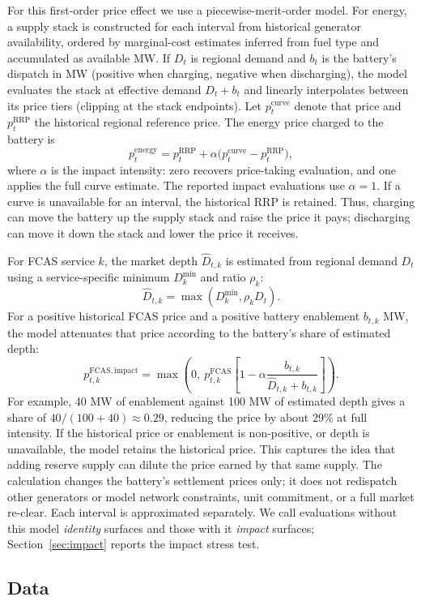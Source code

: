 \documentclass{article}
\begin{document}
For this first-order price effect we use a piecewise-merit-order model. For
energy, a supply stack is
constructed for each interval from historical generator availability, ordered
by marginal-cost estimates inferred from fuel type and accumulated as available
MW. If $D_t$ is regional demand and $b_t$ is the battery's dispatch in MW
(positive when charging, negative when discharging), the model evaluates the
stack at effective demand $D_t+b_t$ and linearly interpolates between its price
tiers (clipping at the stack endpoints). Let $p_t^{\mathrm{curve}}$ denote that
price and $p_t^{\mathrm{RRP}}$ the historical regional reference price. The
energy price charged to the battery is
\[
  p_t^{\mathrm{energy}}
  = p_t^{\mathrm{RRP}}
    + \alpha\bigl(p_t^{\mathrm{curve}}-p_t^{\mathrm{RRP}}\bigr),
\]
where $\alpha$ is the impact intensity: zero recovers price-taking evaluation,
and one applies the full curve estimate. The reported impact evaluations use
$\alpha=1$. If a curve is unavailable for an
interval, the historical RRP is retained. Thus, charging can move the battery up
the supply stack and raise the price it pays; discharging can move it down the
stack and lower the price it receives.

For FCAS service $k$, the market depth $\widehat D_{t,k}$ is estimated from
regional demand $D_t$ using a service-specific minimum $D_k^{\min}$ and ratio
$\rho_k$:
\[
  \widehat D_{t,k}=\max(D_k^{\min},\rho_k D_t).
\]
For a positive historical FCAS price and a positive battery enablement
$b_{t,k}$ MW, the model attenuates that price according to the battery's share
of estimated depth:
\[
  p_{t,k}^{\mathrm{FCAS,impact}}
  = \max\!\left(0,\ p_{t,k}^{\mathrm{FCAS}}
    \left[1-\alpha\frac{b_{t,k}}{\widehat D_{t,k}+b_{t,k}}\right]\right).
\]
For example, 40 MW of enablement against 100 MW of estimated depth gives a
share of $40/(100+40)\approx 0.29$, reducing the price by about 29\% at full
intensity.
If the historical price or enablement is non-positive, or depth is unavailable,
the model retains the historical price. This captures the idea that adding
reserve supply can dilute the price earned by that same supply. The calculation
changes the battery's settlement prices only; it does not redispatch other
generators or model network constraints, unit
commitment, or a full market re-clear. Each interval is approximated separately.
We call evaluations without this model \emph{identity} surfaces and those with
it \emph{impact} surfaces; Section~\ref{sec:impact} reports the impact stress
test.

\subsection{Data}
\end{document}
